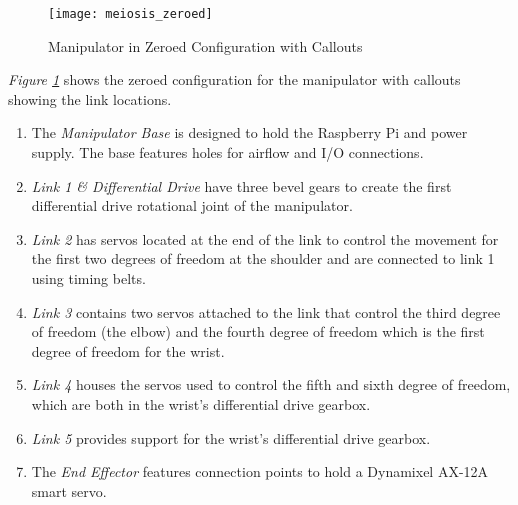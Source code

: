\begin{figure}[htp]
  \center
  \texttt{[image: meiosis\_zeroed]}
  \caption{Manipulator in Zeroed Configuration with Callouts}
  \label{fig:meiosis_zeroed}
\end{figure}
\emph{Figure \ref{fig:meiosis_zeroed}} shows the zeroed configuration for the manipulator with callouts showing the link locations.
\begin{enumerate}[label=\alph*.]
  \item The \emph{Manipulator Base} is designed to hold the Raspberry Pi and power supply. The base features holes for airflow and I/O connections.
  \item \emph{Link 1 \& Differential Drive} have three bevel gears to create the first differential drive rotational joint of the manipulator.
  \item \emph{Link 2} has servos located at the end of the link to control the movement for the first two degrees of freedom at the shoulder and are connected to link 1 using timing belts.
  \item \emph{Link 3} contains two servos attached to the link that control the third degree of freedom (the elbow) and the fourth degree of freedom which is the first degree of freedom for the wrist.
  \item \emph{Link 4 }houses the servos used to control the fifth and sixth degree of freedom, which are both in the wrist’s differential drive gearbox.
  \item \emph{Link 5} provides support for the wrist’s differential drive gearbox.
  \item The \emph{End Effector} features connection points to hold a Dynamixel AX-12A smart servo.
\end{enumerate}

